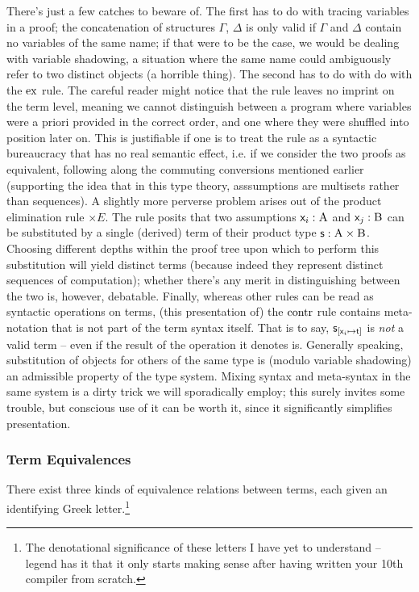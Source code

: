 There's just a few catches to beware of.
The first has to do with tracing variables in a proof; the concatenation of structures $\Gamma$, $\Delta$ is only valid if $\Gamma$ and $\Delta$ contain no variables of the same name; if that were to be the case, we would be dealing with variable shadowing, a situation where the same name could ambiguously refer to two distinct objects (a horrible thing).
The second has to do with do with the $\mathrm{ex}{}$ rule. 
The careful reader might notice that the rule leaves no imprint on the term level, meaning we cannot distinguish between a program where variables were a priori provided in the correct order, and one where they were shuffled into position later on.
This is justifiable if one is to treat the rule as a syntactic bureaucracy that has no real semantic effect, i.e. if we consider the two proofs as equivalent, following along the commuting conversions mentioned earlier (supporting the idea that in this type theory, asssumptions are multisets rather than sequences).
A slightly more perverse problem arises out of the product elimination rule $\times E$.
The rule posits that two assumptions $\mathsf{\mathsf{x}_{\mathnormal{i}} }: \normalfont\textsc{A}$ and $\mathsf{\mathsf{x}_{\mathnormal{j}}}: \normalfont\textsc{B}$ can be substituted by a single (derived) term of their product type $\mathsf{s}: \normalfont\textsc{A}\times\normalfont\textsc{B}$. 
Choosing different depths within the proof tree upon which to perform this substitution will yield distinct terms (because indeed they represent distinct sequences of computation); whether there's any merit in distinguishing between the two is, however, debatable.
Finally, whereas other rules can be read as syntactic operations on terms, (this presentation of) the $\mathrm{contr}{}$ rule contains meta-notation that is not part of the term syntax itself.
That is to say, $\mathsf{s}_{[\mathsf{\mathsf{x}_{\mathnormal{i}} } \mapsto \mathsf{t}]}$ is \textit{not} a valid term -- even if the result of the operation it denotes is.
Generally speaking, substitution of objects for others of the same type is (modulo variable shadowing) an admissible property of the type system.
Mixing syntax and meta-syntax in the same system is a dirty trick we will sporadically employ; this surely invites some trouble, but conscious use of it can be worth it, since it significantly simplifies presentation.

\subsubsection{Term Equivalences}
There exist three kinds of equivalence relations between terms, each given an identifying Greek letter.\footnote{The denotational significance of these letters I have yet to understand -- legend has it that it only starts making sense after having written your 10th compiler from scratch.}

